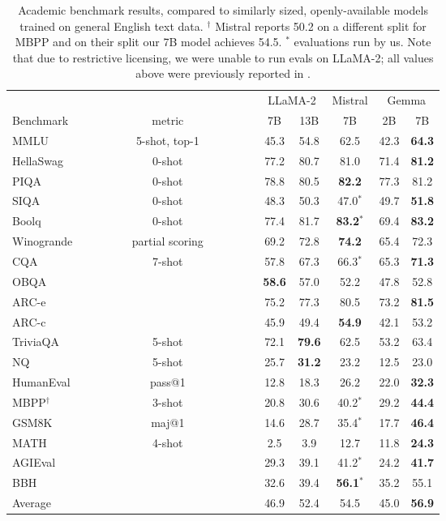 \documentclass[11pt, a4paper, logo, twocolumn, copyright, nonumbering]{googledeepmind}
\begin{document}
\begin{table}[t!]
    \centering
    \begin{tabular}{l c c c c c c }
    \toprule
         & & \multicolumn{2}{c}{LLaMA-2} & Mistral & \multicolumn{2}{c}{Gemma}\\
         \cmidrule(l{3pt}r{3pt}){3-4}\cmidrule(l{3pt}r{3pt}){5-5}\cmidrule(l{3pt}r{3pt}){6-7}
Benchmark & ~~~~~~~~~~~~metric~~~~~~~~~~~~  & 7B & 13B & 7B & 2B & 7B \\
      \midrule
MMLU & 5-shot, top-1 & 45.3 & 54.8 & 62.5 & 42.3 & \textbf{64.3} \\
        \midrule
HellaSwag & 0-shot   & 77.2 & 80.7 & 81.0 & 71.4 & \textbf{81.2}\\
PIQA & 0-shot        & 78.8 & 80.5 & \textbf{82.2} & 77.3 & 81.2\\
SIQA & 0-shot       & 48.3 & 50.3 &  \phantom{$^*$}47.0$^*$ & 49.7 & \textbf{51.8}  \\
Boolq & 0-shot      & 77.4 & 81.7 &  \phantom{$^*$}\textbf{83.2}$^*$ & 69.4 & \textbf{83.2}  \\
Winogrande & partial scoring & 69.2 & 72.8 & \textbf{74.2} & 65.4 & 72.3  \\
CQA & 7-shot  & 57.8 & 67.3 & \phantom{$^*$}66.3$^*$ & 65.3 & \textbf{71.3}  \\
OBQA & & \textbf{58.6} & 57.0 & 52.2 &  47.8 & 52.8  \\
ARC-e & & 75.2 & 77.3 & 80.5 & 73.2 & \textbf{81.5} \\
ARC-c &  & 45.9 & 49.4 & \textbf{54.9} & 42.1 & 53.2\\
\midrule
TriviaQA & 5-shot & 72.1 & \textbf{79.6} & 62.5 & 53.2 & 63.4 \\
NQ & 5-shot & 25.7 & \textbf{31.2} & 23.2 &  12.5 & 23.0 \\
\midrule
HumanEval & pass@1 & 12.8 & 18.3 & 26.2 & 22.0 & \textbf{32.3} \\
MBPP$^{\dagger}$ & 3-shot & 20.8 & 30.6 & \phantom{$^*$}40.2$^*$ & 29.2 & \textbf{44.4}  \\
GSM8K & maj@1 & 14.6 & 28.7 &  \phantom{$^*$}35.4$^*$ & 17.7 & \textbf{46.4}  \\
MATH & 4-shot  & 2.5 & 3.9 & 12.7 & 11.8 & \textbf{24.3} \\
\midrule
AGIEval & & 29.3 & 39.1 &  \phantom{$^*$}41.2$^*$ & 24.2 & \textbf{41.7} \\
BBH & & 32.6 & 39.4 & \phantom{$^*$}\textbf{56.1}$^*$ & 35.2 & 55.1  \\
\midrule
Average & & 46.9 & 52.4 & 54.5 & 45.0 & \textbf{56.9}  \\
\bottomrule
\end{tabular}
    \caption{Academic benchmark results, compared to similarly sized, openly-available models trained on general English text data.
   $^{\dagger}$ Mistral reports 50.2 on a different split for MBPP and on their split our 7B model achieves 54.5.
   $^*$ evaluations run by us. Note that due to restrictive licensing, we were unable to run evals on LLaMA-2; all values above were previously reported in \cite{llama2}.
    }
    \label{tab:pretrain_auto_evals}
\end{table}
\end{document}
